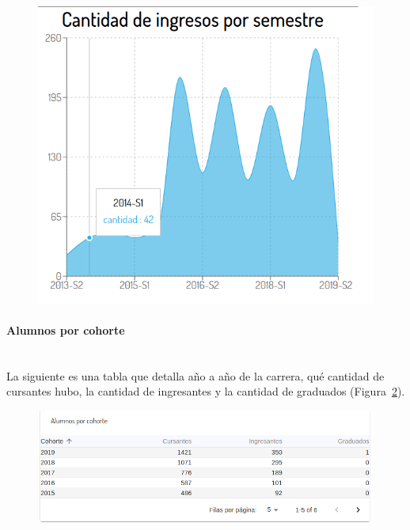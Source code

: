 \begin{figure}[H]
  \centering
    \includegraphics[scale=0.4]{images/seguimiento-academico/sa-ingresossemestre.png}
  \label{fig:sa-ingresos-semestre}
\end{figure}

\paragraph{Alumnos por cohorte} \mbox{}\\
La siguiente es una tabla que detalla año a año de la carrera, qué cantidad de cursantes hubo, la cantidad de ingresantes y la cantidad de graduados  (Figura~\ref{fig:sa-alumnos-cohorte}).

\begin{figure}[H]
  \centering
    \includegraphics[scale=0.4]{images/seguimiento-academico/sa-alumnos-cohorte.png}
  \label{fig:sa-alumnos-cohorte}
\end{figure}


